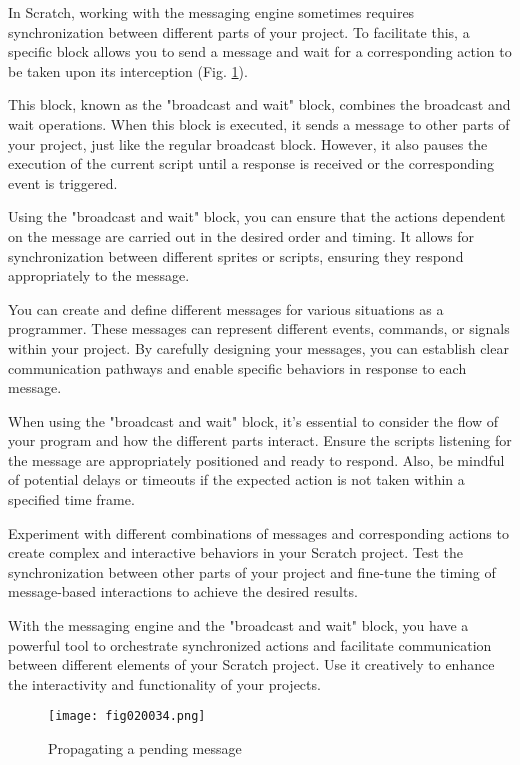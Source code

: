 In Scratch, working with the messaging engine sometimes requires synchronization between different parts of your project. To facilitate this, a specific block allows you to send a message and wait for a corresponding action to be taken upon its interception (Fig. \ref{fig020034}).

This block, known as the "broadcast and wait" block, combines the broadcast and wait operations. When this block is executed, it sends a message to other parts of your project, just like the regular broadcast block. However, it also pauses the execution of the current script until a response is received or the corresponding event is triggered.

Using the "broadcast and wait" block, you can ensure that the actions dependent on the message are carried out in the desired order and timing. It allows for synchronization between different sprites or scripts, ensuring they respond appropriately to the message.

You can create and define different messages for various situations as a programmer. These messages can represent different events, commands, or signals within your project. By carefully designing your messages, you can establish clear communication pathways and enable specific behaviors in response to each message.

When using the "broadcast and wait" block, it's essential to consider the flow of your program and how the different parts interact. Ensure the scripts listening for the message are appropriately positioned and ready to respond. Also, be mindful of potential delays or timeouts if the expected action is not taken within a specified time frame.

Experiment with different combinations of messages and corresponding actions to create complex and interactive behaviors in your Scratch project. Test the synchronization between other parts of your project and fine-tune the timing of message-based interactions to achieve the desired results.

With the messaging engine and the "broadcast and wait" block, you have a powerful tool to orchestrate synchronized actions and facilitate communication between different elements of your Scratch project. Use it creatively to enhance the interactivity and functionality of your projects.

\begin{figure}[H]
   \centering
   \texttt{[image: fig020034.png]}
   \caption{Propagating a pending message}
\label{fig020034}
\end{figure}

